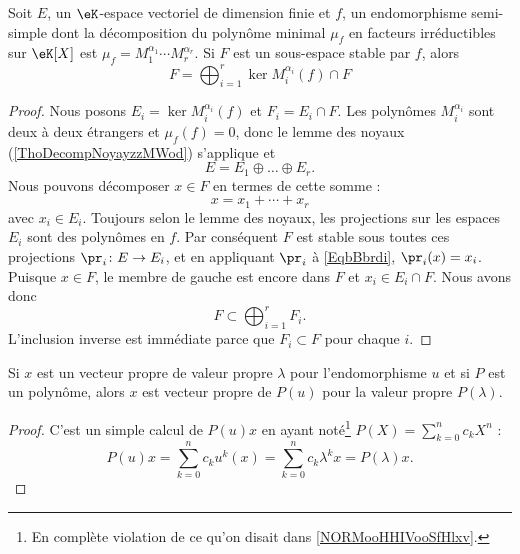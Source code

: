 \begin{corollary}   \label{CorKiSCkC}
	Soit \( E\), un \( \eK\)-espace vectoriel de dimension finie et \( f\), un endomorphisme semi-simple dont la décomposition du polynôme minimal \( \mu_f\) en facteurs irréductibles sur \( \eK[X]\) est \( \mu_f=M_1^{\alpha_1}\cdots M_r^{\alpha_r}\). Si \( F\) est un sous-espace stable par \( f\), alors
	\begin{equation}
		F=\bigoplus_{i=1}^r\ker M_i^{\alpha_i}(f)\cap F
	\end{equation}
\end{corollary}

\begin{proof}
	Nous posons \( E_i=\ker M_i^{\alpha_i}(f)\) et \( F_i=E_i\cap F\). Les polynômes \( M_i^{\alpha_i}\) sont deux à deux étrangers et \( \mu_f(f)=0\), donc le lemme des noyaux (\ref{ThoDecompNoyayzzMWod}) s'applique et
	\begin{equation}
		E=E_1\oplus\ldots\oplus E_r.
	\end{equation}
	Nous pouvons décomposer \( x\in F\) en termes de cette somme :
	\begin{equation}     \label{EqbBbrdi}
		x=x_1+\cdots +x_r
	\end{equation}
	avec \( x_i\in E_i\). Toujours selon le lemme des noyaux, les projections sur les espaces \( E_i\) sont des polynômes en \( f\). Par conséquent \( F\) est stable sous toutes ces projections \( \pr_i\colon E\to E_i\), et en appliquant \( \pr_i\) à \eqref{EqbBbrdi}, \( \pr_i(x)=x_i\). Puisque \( x\in F\), le membre de gauche est encore dans \( F\) et \( x_i\in E_i\cap F\). Nous avons donc
	\begin{equation}
		F\subset\bigoplus_{i=1}^rF_i.
	\end{equation}
	L'inclusion inverse est immédiate parce que \( F_i\subset F\) pour chaque \( i\).
\end{proof}

\begin{lemma}   \label{LemVISooHxMdbr}
	Si \( x\) est un vecteur propre de valeur propre \( \lambda\) pour l'endomorphisme \( u\) et si \( P\) est un polynôme, alors \( x\) est vecteur propre de \( P(u)\) pour la valeur propre \( P(\lambda)\).
\end{lemma}

\begin{proof}
	C'est un simple calcul de \( P(u)x\) en ayant noté\footnote{En complète violation de ce qu'on disait dans \ref{NORMooHHIVooSfHlxv}.} \( P(X)=\sum_{k=0}^nc_kX^n\) :
	\begin{equation}
		P(u)x=\sum_{k=0}^nc_ku^k(x)=\sum_{k=0}^nc_k\lambda^kx=P(\lambda)x.
	\end{equation}
\end{proof}

